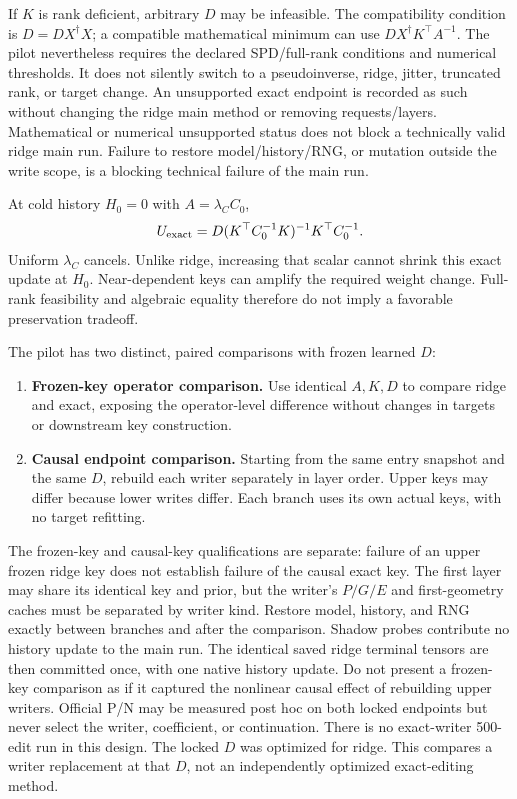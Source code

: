 \documentclass[10pt]{article}
\begin{document}
If $K$ is rank deficient, arbitrary $D$ may be infeasible. The compatibility
condition is $D=DX^\dagger X$; a compatible mathematical minimum can use
$DX^\dagger K^\top A^{-1}$. The pilot nevertheless requires the declared
SPD/full-rank conditions and numerical thresholds. It does not silently
switch to a pseudoinverse, ridge, jitter, truncated rank, or target change.
An unsupported exact endpoint is recorded as such without changing the
ridge main method or removing requests/layers. Mathematical or numerical
unsupported status does not block a technically valid ridge main run.
Failure to restore model/history/RNG, or mutation outside the write scope,
is a blocking technical failure of the main run.

At cold history $H_0=0$ with $A=\lambda_C C_0$,
\[
 U_{\rm exact}
 =D(K^\top C_0^{-1}K)^{-1}K^\top C_0^{-1}.
\]
Uniform $\lambda_C$ cancels. Unlike ridge, increasing that scalar cannot
shrink this exact update at $H_0$. Near-dependent keys can amplify the
required weight change. Full-rank feasibility and algebraic equality
therefore do not imply a favorable preservation tradeoff.

The pilot has two distinct, paired comparisons with frozen learned $D$:
\begin{enumerate}
\item \textbf{Frozen-key operator comparison.} Use identical $A,K,D$
      to compare ridge and exact, exposing the operator-level difference
      without changes in targets or downstream key construction.
\item \textbf{Causal endpoint comparison.} Starting from the same entry
      snapshot and the same $D$, rebuild each writer separately in layer
      order. Upper keys may differ because lower writes differ. Each
      branch uses its own actual keys, with no target refitting.
\end{enumerate}
The frozen-key and causal-key qualifications are separate: failure of an
upper frozen ridge key does not establish failure of the causal exact key.
The first layer may share its identical key and prior, but the writer's
$P/G/E$ and first-geometry caches must be separated by writer kind.
Restore model, history, and RNG exactly between branches and after the
comparison. Shadow probes contribute no history update to the main run.
The identical saved ridge terminal tensors are then committed once, with
one native history update. Do not present a frozen-key comparison as if it captured the
nonlinear causal effect of rebuilding upper writers. Official P/N may
be measured post hoc on both locked endpoints but never select the
writer, coefficient, or continuation. There is no exact-writer 500-edit
run in this design.
The locked $D$ was optimized for ridge. This compares a writer replacement
at that $D$, not an independently optimized exact-editing method.
\end{document}
